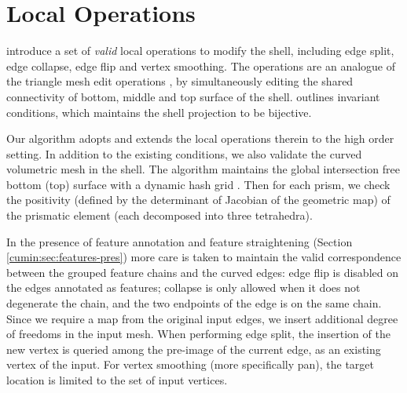 \section{Local Operations}\label{app:local-ops}
\cite[Fig. 11]{jiang2020bijective} introduce a set of \emph{valid} local operations to modify the shell, including edge split, edge collapse, edge flip and vertex smoothing. 
The operations are an analogue of the triangle mesh edit operations \cite{dunyach2013adaptive}, 
by simultaneously editing the shared connectivity of bottom, middle and top surface of the shell.
\cite[Theorem 3.7]{jiang2020bijective} outlines invariant conditions, which maintains the shell projection to be bijective. 

Our algorithm adopts and extends the local operations therein to the high order setting. In addition to the existing conditions, we also validate the curved volumetric mesh in the shell.
The algorithm maintains the global intersection free bottom (top) surface with a dynamic hash grid \cite{teschner2003optimized}. Then for each prism, we check the positivity (defined by the determinant of Jacobian of the geometric map) of the prismatic element (each decomposed into three tetrahedra).

In the presence of feature annotation and feature straightening (Section \ref{cumin:sec:features-pres}) more care is taken to maintain the valid correspondence between the grouped feature chains and the curved edges: 
edge flip is disabled on the edges annotated as features; collapse is only allowed when it does not degenerate the chain, and the two endpoints of the edge is on the same chain. 
Since we require a map from the original input edges, we insert additional degree of freedoms in the input mesh. When performing edge split, the insertion of the new vertex is queried among the pre-image of the current edge, as an existing vertex of the input. For vertex smoothing (more specifically pan), the target location is limited to the set of input vertices.



